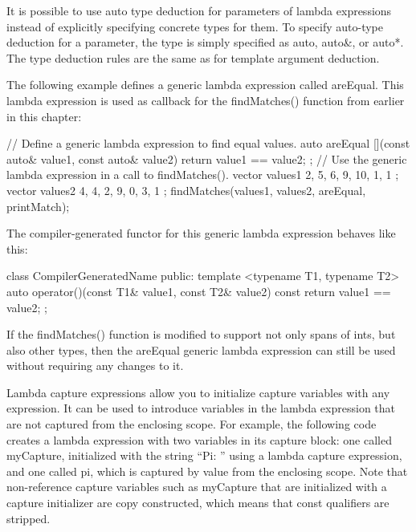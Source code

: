 
It is possible to use auto type deduction for parameters of lambda expressions instead of explicitly specifying concrete types for them. To specify auto-type deduction for a parameter, the type is simply specified as auto, auto\&, or auto*. The type deduction rules are the same as for template argument deduction.

The following example defines a generic lambda expression called areEqual. This lambda expression is used as callback for the findMatches() function from earlier in this chapter:

\begin{cpp}
// Define a generic lambda expression to find equal values.
auto areEqual { [](const auto& value1, const auto& value2) {
        return value1 == value2; } };
// Use the generic lambda expression in a call to findMatches().
vector values1 { 2, 5, 6, 9, 10, 1, 1 };
vector values2 { 4, 4, 2, 9, 0, 3, 1 };
findMatches(values1, values2, areEqual, printMatch);
\end{cpp}

The compiler-generated functor for this generic lambda expression behaves like this:

\begin{cpp}
class CompilerGeneratedName
{
    public:
        template <typename T1, typename T2>
        auto operator()(const T1& value1, const T2& value2) const {
            return value1 == value2; }
};
\end{cpp}

If the findMatches() function is modified to support not only spans of ints, but also other types, then the areEqual generic lambda expression can still be used without requiring any changes to it.


Lambda capture expressions allow you to initialize capture variables with any expression. It can be used to introduce variables in the lambda expression that are not captured from the enclosing scope. For example, the following code creates a lambda expression with two variables in its capture block: one called myCapture, initialized with the string “Pi: ” using a lambda capture expression, and one called pi, which is captured by value from the enclosing scope. Note that non-reference capture variables such as myCapture that are initialized with a capture initializer are copy constructed, which means that const qualifiers are stripped.

